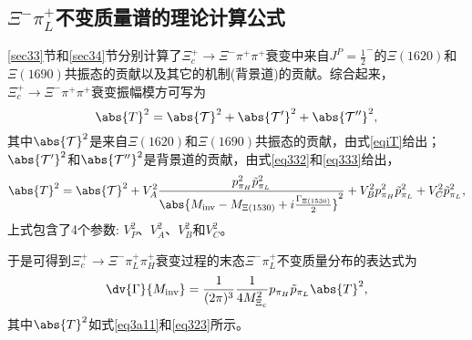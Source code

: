 \subsection{$\Xi^{-}\pi_{L}^{+}$不变质量谱的理论计算公式}
\ref{sec33}节和\ref{sec34}节分别计算了$\Xi_{c}^{+}\to\Xi^{-}\pi^{+}\pi^{+}$衰变中来自$J^{P}=\frac{1}{2}^{-}$的$\Xi(1620)$和$\Xi(1690)$共振态的贡献以及其它的机制(背景道)的贡献。综合起来，$\Xi_{c}^{+}\to\Xi^{-}\pi^{+}\pi^{+}$衰变振幅模方可写为
\begin{equation}
	\abs{T}^2=\abs{\mathcal{T}}^2+\abs{\mathcal{T}'}^2+\abs{\mathcal{T}''}^2,
\end{equation}
其中$\abs{\mathcal{T}}^2$是来自$\Xi(1620)$和$\Xi(1690)$共振态的贡献，由式\eqref{eqiT}给出；$\abs{\mathcal{T}'}^2$和$\abs{\mathcal{T}''}^2$是背景道的贡献，由式\eqref{eq332}和\eqref{eq333}给出，
\begin{equation}
\label{eq3a11}
\abs{T}^2=\abs{\mathcal{T}}^2+V_A^2\frac{p_{\pi_{H}}^2\tilde{p}_{\pi_{L}}^2}{\abs{M_{\text{inv}}-M_{\Xi(1530)}+i\frac{\Gamma_{\Xi(1530)}}{2}}^2}+V_B^2p_{\pi_{H}}^2\tilde{p}_{\pi_{L}}^2+V_C^2\tilde{p}_{\pi_{L}}^2,
\end{equation}
上式包含了4个参数: $V_{P}^2$、$V_A^2$、$V_B^2$和$V_C^2$。\par
于是可得到$\Xi_{c}^{+}\to\Xi^{-}\pi^{+}_{L}\pi^{+}_{H}$衰变过程的末态$\Xi^{-}\pi_{L}^{+}$不变质量分布的表达式为
\begin{equation}
\label{invmass}
\dv{\Gamma}{M_{\text{inv}}}=\frac{1}{(2\pi)^{3}}\frac{1}{4M_{\Xi_{c}}^2}p_{\pi_{H}}\tilde{p}_{\pi_{L}}\abs{T}^2,
\end{equation}
其中$\abs{T}^2$如式\eqref{eq3a11}和\eqref{eq323}所示。
